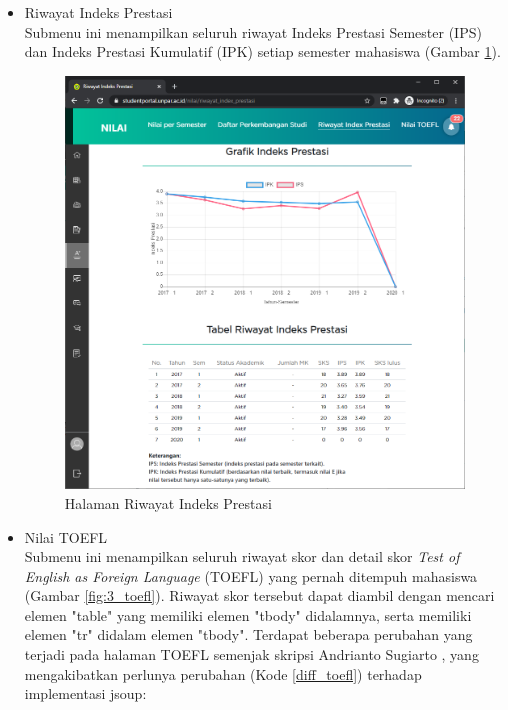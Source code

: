\begin{itemize}
        \item Riwayat Indeks Prestasi\\
       Submenu ini menampilkan seluruh riwayat Indeks Prestasi Semester (IPS) dan Indeks Prestasi Kumulatif (IPK) setiap semester mahasiswa (Gambar \ref{fig:3_rip}).
       
       \begin{figure}[H]
        	\centering
        	\includegraphics[scale=0.4]{Gambar/nilai_rip.png}
        	\caption{Halaman Riwayat Indeks Prestasi} 
        	\label{fig:3_rip}
        \end{figure}
        
        \item Nilai TOEFL\\
       Submenu ini menampilkan seluruh riwayat skor dan detail skor \textit{Test of English as Foreign Language} (TOEFL) yang pernah ditempuh mahasiswa (Gambar \ref{fig:3_toefl}). Riwayat skor tersebut dapat diambil dengan mencari elemen "table" yang memiliki elemen "tbody" didalamnya, serta memiliki elemen "tr" didalam elemen "tbody".
       Terdapat beberapa perubahan yang terjadi pada halaman TOEFL semenjak skripsi Andrianto Sugiarto \cite{ifstupor}, yang mengakibatkan perlunya perubahan (Kode \ref{diff_toefl}) terhadap implementasi jsoup:


\end{itemize}

